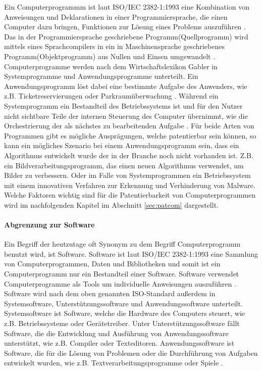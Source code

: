 Ein Computerprogrammm ist laut ISO/IEC 2382-1:1993 
eine Kombination von Anweisungen und Deklarationen in einer
Programmiersprache, die einen Computer dazu bringen, 
Funktionen zur Lösung eines Problems auszuführen 
\cite{instituteofelectricalandelectronicsengineersinc.ISO47652010}.
Das in der Programmiersprache geschriebene Programm(Quellprogramm) wird 
mittels eines Sprachcompilers in ein in Maschinensprache geschriebenes 
Programm(Objektprogramm) aus Nullen und Einsen umgewandelt \cite{WasIstProgramm}.
Computerprogramme werden nach dem Wirtschaftslexikon Gabler in Systemprogramme
und Anwendungsprogramme unterteilt. 
Ein Anwendungsprogramm löst dabei eine bestimmte Aufgabe des Anwenders, 
wie z.B. Ticketreservierungen oder Parkraumüberwachung 
\cite{lackesDefinitionAnwendungsprogramm}. 
Während ein Systemprogramm ein Bestandteil des Betriebssystems ist und 
für den Nutzer nicht sichtbare Teile der internen Steuerung des Computer übernimmt,
wie die Orchestrierung der als nächstes zu bearbeitenden Aufgabe \cite{lackesDefinitionSystemprogramm}.
Für beide Arten von Programmen gibt es mögliche Ausprägungen, 
welche patentierbar sein können, so kann ein mögliches Szenario bei einem Anwendungsprogramm sein,
dass ein Algorithmus entwickelt wurde der in der Branche noch nicht vorhanden ist. Z.B. ein
Bildverarbeitungsprogramm, das einen neuen Algorithmus verwendet, um Bilder zu verbessern.
Oder im Falle von Systemprogrammen ein Betriebssystem mit einem 
innovativen Verfahren zur Erkennung und Verhinderung von Malware.
Welche Faktoren wichtig sind für die Patentierbarkeit von Computerprogrammen wird im nachfolgenden 
Kapitel im Abschnitt \ref{sec:patcom} dargestellt.
\paragraph{Abgrenzung zur Software}
Ein Begriff der heutzutage oft Synonym zu dem Begriff Computerprogramm benutzt wird,
ist Software. Software ist laut ISO/IEC 2382-1:1993 eine Sammlung von Computerprogrammen, 
Daten und Bibliotheken und somit ist ein Computerprogramm nur ein Bestandteil einer Software.
Software verwendet Computerprogramme als Tools um individuelle Anweisungen auszuführen 
\cite{ComputerProgrammeUnverzichtbareComputerprogramme}.
Software wird nach dem oben genannten ISO-Standard außerdem in 
Systemsoftware, Unterstützungssoftware und Anwendungssoftware unterteilt.
Systemsoftware ist Software, welche die Hardware des Computers steuert, 
wie z.B. Betriebssysteme oder Gerätetreiber. Unter Unterstützungssoftware 
fällt Software, die die Entwicklung und Ausführung von Anwendungssoftware
unterstützt, wie z.B. Compiler oder Texteditoren. Anwendungssoftware ist
Software, die für die Lösung von Problemen oder die Durchführung von Aufgaben
entwickelt wurden, wie z.B. Textverarbeitungsprogramme oder Spiele
\cite{instituteofelectricalandelectronicsengineersinc.ISO47652010}.



